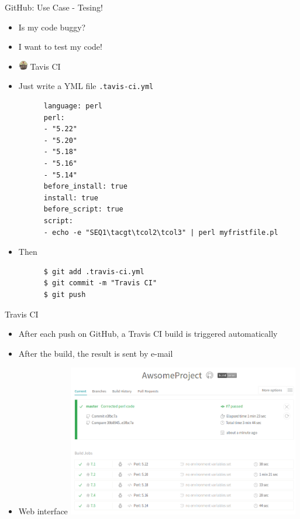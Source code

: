 \begin{frame}[fragile]{GitHub: Use Case - Tesing!}
  \begin{itemize}
  \item<1-> Is my code buggy?
  \item<2-> I want to test my code!
  \item<3-> \includegraphics[width=15px]{images/Travis_CI_Logo.png} Tavis CI
  \item<4-> Just write a YML file \verb+.tavis-ci.yml+
    \begin{lstlisting}
      language: perl
      perl:
      - "5.22"
      - "5.20"
      - "5.18"
      - "5.16"
      - "5.14"
      before_install: true
      install: true
      before_script: true
      script:
      - echo -e "SEQ1\tacgt\tcol2\tcol3" | perl myfristfile.pl
    \end{lstlisting}
  \item<5-> Then
    \begin{lstlisting}
      $ git add .travis-ci.yml
      $ git commit -m "Travis CI"
      $ git push
    \end{lstlisting}
  \end{itemize}
\end{frame}



\begin{frame}[fragile]{Travis CI}
  \begin{itemize}
  \item After each push on GitHub, a Travis CI build is triggered automatically
  \item After the build, the result is sent by e-mail
  \item Web interface
    \includegraphics[width=0.8\textwidth]{images/hosting_services_use_case_10.png}
  \end{itemize}
\end{frame}

